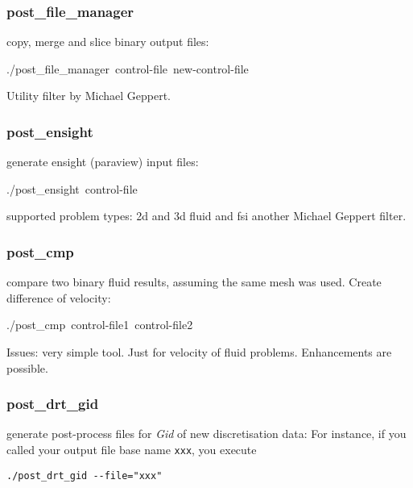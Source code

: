 \subsubsection{post\_file\_manager}

copy, merge and slice binary output files:

\begin{lyxcode}
./post\_file\_manager~control-file~new-control-file
\end{lyxcode}
Utility filter by Michael Geppert.


\subsubsection{post\_ensight}

generate ensight (paraview) input files:

\begin{lyxcode}
./post\_ensight~control-file
\end{lyxcode}
supported problem types: 2d and 3d fluid and fsi another Michael Geppert
filter.


\subsubsection{post\_cmp}

compare two binary fluid results, assuming the same mesh was used.
Create difference of velocity:

\begin{lyxcode}
./post\_cmp~control-file1~control-file2
\end{lyxcode}
Issues: very simple tool. Just for velocity of fluid problems. Enhancements
are possible.


\subsubsection{post\_drt\_gid}

generate post-process files for \emph{Gid} of new discretisation data: For
instance, if you
called your output file base name \texttt{xxx}, you execute
\begin{verbatim}
./post_drt_gid --file="xxx"
\end{verbatim}


